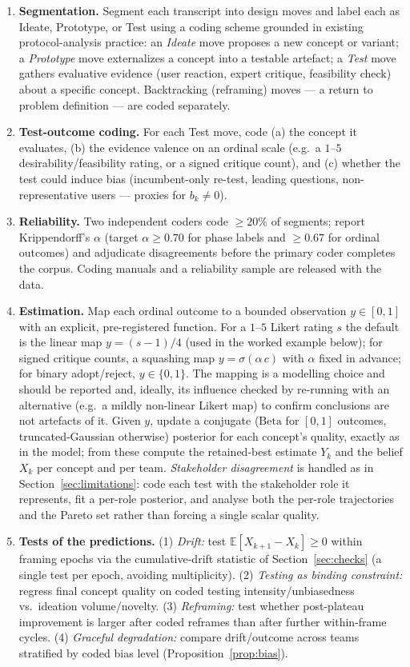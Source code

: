 \documentclass[11pt]{article}
\newcommand{\E}{\mathbb{E}}
\begin{document}
\begin{enumerate}
\item \textbf{Segmentation.} Segment each transcript into design moves and label each as Ideate, Prototype, or Test using a coding scheme grounded in existing protocol-analysis practice: an \emph{Ideate} move proposes a new concept or variant; a \emph{Prototype} move externalizes a concept into a testable artefact; a \emph{Test} move gathers evaluative evidence (user reaction, expert critique, feasibility check) about a specific concept. Backtracking (reframing) moves --- a return to problem definition --- are coded separately.
\item \textbf{Test-outcome coding.} For each Test move, code (a) the concept it evaluates, (b) the evidence valence on an ordinal scale (e.g.\ a $1$--$5$ desirability/feasibility rating, or a signed critique count), and (c) whether the test could induce bias (incumbent-only re-test, leading questions, non-representative users --- proxies for $b_k\neq0$).
\item \textbf{Reliability.} Two independent coders code $\ge20\%$ of segments; report Krippendorff's $\alpha$ (target $\alpha\ge0.70$ for phase labels and $\ge0.67$ for ordinal outcomes) and adjudicate disagreements before the primary coder completes the corpus. Coding manuals and a reliability sample are released with the data.
\item \textbf{Estimation.} Map each ordinal outcome to a bounded observation $y\in[0,1]$ with an explicit, pre-registered function. For a $1$--$5$ Likert rating $s$ the default is the linear map $y=(s-1)/4$ (used in the worked example below); for signed critique counts, a squashing map $y=\sigma(\alpha\,c)$ with $\alpha$ fixed in advance; for binary adopt/reject, $y\in\{0,1\}$. The mapping is a modelling choice and should be reported and, ideally, its influence checked by re-running with an alternative (e.g.\ a mildly non-linear Likert map) to confirm conclusions are not artefacts of it. Given $y$, update a conjugate ($\mathrm{Beta}$ for $[0,1]$ outcomes, truncated-Gaussian otherwise) posterior for each concept's quality, exactly as in the model; from these compute the retained-best estimate $Y_k$ and the belief $X_k$ per concept and per team. \emph{Stakeholder disagreement} is handled as in Section~\ref{sec:limitations}: code each test with the stakeholder role it represents, fit a per-role posterior, and analyse both the per-role trajectories and the Pareto set rather than forcing a single scalar quality.
\item \textbf{Tests of the predictions.} (1) \emph{Drift:} test $\E[X_{k+1}-X_k]\ge0$ within framing epochs via the cumulative-drift statistic of Section~\ref{sec:checks} (a single test per epoch, avoiding multiplicity). (2) \emph{Testing as binding constraint:} regress final concept quality on coded testing intensity/unbiasedness vs.\ ideation volume/novelty. (3) \emph{Reframing:} test whether post-plateau improvement is larger after coded reframes than after further within-frame cycles. (4) \emph{Graceful degradation:} compare drift/outcome across teams stratified by coded bias level (Proposition~\ref{prop:bias}).
\end{enumerate}
\end{document}
